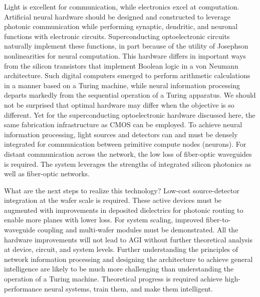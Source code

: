 \documentclass[twocolumn]{article}
\begin{document}
Light is excellent for communication, while electronics excel at computation. Artificial neural hardware should be designed and constructed to leverage photonic communication while performing synaptic, dendritic, and neuronal functions with electronic circuits. Superconducting optoelectronic circuits naturally implement these functions, in part because of the utility of Josephson nonlinearities for neural computation. This hardware differs in important ways from the silicon transistors that implement Boolean logic in a von Neumann architecture. Such digital computers emerged to perform arithmetic calculations in a manner based on a Turing machine, while neural information processing departs markedly from the sequential operation of a Turing apparatus. We should not be surprised that optimal hardware may differ when the objective is so different. Yet for the superconducting optoelectronic hardware discussed here, the same fabrication infrastructure as CMOS can be employed. To achieve neural information processing, light sources and detectors can and must be densely integrated for communication between primitive compute nodes (neurons). For distant communication across the network, the low loss of fiber-optic waveguides is required. The system leverages the strengths of integrated silicon photonics as well as fiber-optic networks.

What are the next steps to realize this technology? Low-cost source-detector integration at the wafer scale is required. These active devices must be augmented with improvements in deposited dielectrics for photonic routing to enable more planes with lower loss. For system scaling, improved fiber-to-waveguide coupling and multi-wafer modules must be demonstrated. All the hardware improvements will not lead to AGI without further theoretical analysis at device, circuit, and system levels. Further understanding the principles of network information processing and designing the architecture to achieve general intelligence are likely to be much more challenging than understanding the operation of a Turing machine. Theoretical progress is required achieve high-performance neural systems, train them, and make them intelligent.



\end{document}
